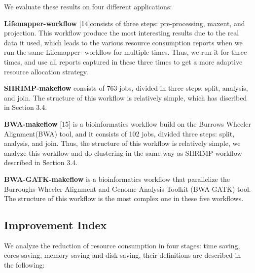 \documentclass[conference]{IEEEtran}
\begin{document}
We evaluate these results on four different applications:

\textbf{Lifemapper-workflow} [14]consists of three steps: pre-processing, maxent, and projection. This workflow produce the most interesting results due to the real data it used, which leads to the various resource consumption reports when we run the same Lifemapper- workflow for multiple times. Thus, we run it for three times, and use all reports captured in these three times to get a more adaptive resource allocation strategy.

\textbf{SHRIMP-makeflow} consists of 763 jobs, divided in three steps: split, analysis, and join. The structure of this workflow is relatively simple, which has discribed in Section 3.4.

\textbf{BWA-makeflow} [15] is a bioinformatics workflow build on the Burrows Wheeler Alignment(BWA) tool, and it consists of 102 jobs, divided three steps: split, analysis, and join. Thus, the structure of this workflow is relatively simple, we analyze this workflow and do clustering in the same way as SHRIMP-workflow described in Section 3.4.

\textbf{BWA-GATK-makeflow} is a bioinformatics workflow that parallelize the Burroughs-Wheeler Alignment and Genome Analysis Toolkit (BWA-GATK) tool. The structure of this workflow is the most complex one in these five workflows.


\subsection{Improvement Index}
We analyze the reduction of resource consumption in four stages: time saving, cores saving, memory saving and disk saving, their definitions are described in the following:
\end{document}
